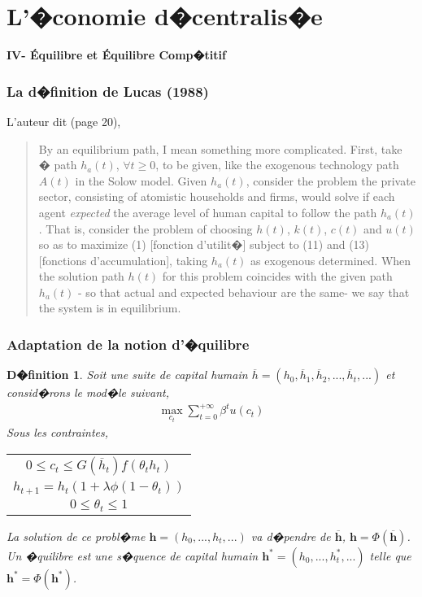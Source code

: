 \documentclass[10pt, hyperref={pdfpagemode=FullScreen}]{beamer} %
\newtheorem{d�finition}[theorem]{D�finition}
\begin{document}
  
\section{L'�conomie d�centralis�e}
  
\begin{frame}
\transdissolve
\begin{block}{}
\centering \huge{\textbf{IV- \'Equilibre et \'Equilibre Comp�titif}}
\end{block}
\end{frame}

\begin{frame}
\frametitle{La d�finition de Lucas (1988)}

L'auteur dit (page 20),
\begin{quotation}
\small{
By an equilibrium path, I mean something more complicated. First, take � path $h_{a}(t)$, $\forall t\geq 0$, to be given, like the exogenous technology path $A(t)$ in the Solow model. Given $h_{a}(t)$, consider the problem the private sector, consisting of atomistic households and firms, would solve if each agent \emph{expected} the average level of human capital to follow the path $h_{a}(t)$. That is, consider the problem of choosing $h(t)$, $k(t)$, $c(t)$ and $u(t)$ so as to maximize (1) [fonction d'utilit�] subject to (11) and (13) [fonctions d'accumulation], taking $h_{a}(t)$ as exogenous determined. When the solution path $h(t)$ for this problem coincides with the given path $h_{a}(t)$ - so that actual and expected behaviour are the same- we say that the system is in equilibrium.
}
\end{quotation}
\end{frame}

\begin{frame}
\frametitle{Adaptation de la notion d'�quilibre}
\begin{d�finition}
\scriptsize{
Soit une suite de capital humain $\overline{h}=(h_{0},\overline{h}_{1}, \overline{h}_{2}, ..., \overline{h}_{t},...)$ et consid�rons le mod�le suivant, 
\begin{eqnarray*}
\max_{c_{t}} \sum_{t=0}^{+\infty} \beta^{t} u(c_{t})
\end{eqnarray*}
Sous les contraintes,
\begin{center}
\begin{tabular}{c}
$0\leq c_{t}\leq G(\overline{h}_{t})f(\theta_{t}h_{t})$\\
$h_{t+1} = h_{t} (1+\lambda\phi(1-\theta_{t}))$ \\
$0\leq \theta_{t} \leq 1$
\end{tabular}
\end{center}
La solution de ce probl�me $\mathbf{h}=(h_{0},..., h_{t},...)$ va d�pendre de $\mathbf{\overline{h}}$, $\mathbf{h}=\Phi(\mathbf{\overline{h}})$.\\
Un �quilibre est une s�quence de capital humain $\mathbf{h^{*}}=(h_{0}, ...,h_{t}^{*},...)$ telle que $\mathbf{h}^{*}=\Phi(\mathbf{h^{*}})$. 
}
\end{d�finition}

\end{frame}
\end{document}
